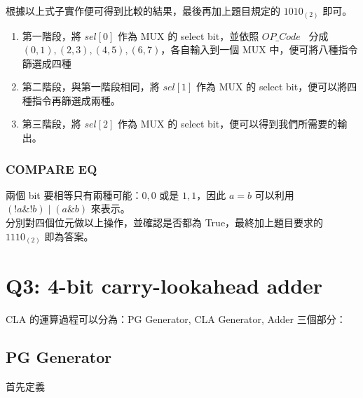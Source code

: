 \documentclass[10.5pt,compsoc,UTF8]{CjC}
\theoremstyle{mystyle}
\begin{document}
根據以上式子實作便可得到比較的結果，最後再加上題目規定的 $1010_{(2)}$ 即可。

\begin{enumerate}
  \item 第一階段，將 $sel[0]$ 作為 MUX 的 select bit，並依照 $OP\_Code$ \
  分成 $(0, 1), (2, 3), (4, 5), (6, 7)$，各自輸入到一個 MUX 中，便可將八種指令篩選成四種 
  \item 第二階段，與第一階段相同，將 $sel[1]$ 作為 MUX 的 select bit，便可以將四種指令再篩選成兩種。
  \item 第三階段，將 $sel[2]$ 作為 MUX 的 select bit，便可以得到我們所需要的輸出。
\end{enumerate}

\subsubsection{COMPARE EQ}
兩個 bit 要相等只有兩種可能：$0, 0$ 或是 $1, 1$，因此 $a = b$ 可以利用 $(!a \& !b) \mid (a \& b)$ 來表示。\\

分別對四個位元做以上操作，並確認是否都為 True，最終加上題目要求的 $1110_{(2)}$ 即為答案。

\section{Q3: 4-bit carry-lookahead adder}
CLA 的運算過程可以分為：PG Generator, CLA Generator, Adder 三個部分：

\subsection{PG Generator}
首先定義
\end{document}
